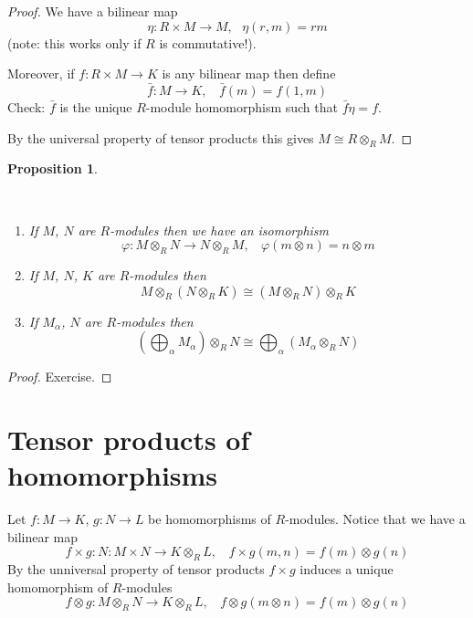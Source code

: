 \documentclass[12pt, letterpaper, oneside]{article}
\theoremstyle{plain}
\newtheorem{proposition}[theorem]{Proposition}
\theoremstyle{definition}
\newcommand{\benu}{\begin{enumerate}}
\newcommand{\eenu}{\end{enumerate}}
\newcommand{\vs}{\vskip 5mm}
\begin{document}
\vs

\begin{proof}
We have a bilinear map 
$$\eta \colon R\times M \to M, \ \ \ \eta(r, m) = rm$$
(note: this works only if $R$ is commutative!). 

Moreover, if $f\colon R\times M \to K$ is any bilinear map then define 
$$\bar{f}\colon M \to K , \ \ \ \ \bar{f}(m) = f(1, m)$$
Check: $\bar{f}$ is the unique $R$-module homomorphism such that $\bar{f}\eta = f$. 

By the universal property of tensor products this gives $M \cong R\otimes_{R} M$.
\end{proof}


\vs\vs

\begin{proposition}\ 

\vskip -13mm

\ 
\benu
\item If $M$, $N$ are $R$-modules then we have an isomorphism
$$\varphi \colon M\otimes_{R}N \to N \otimes_{R} M, \ \ \ \ \varphi(m\otimes n) = n\otimes m$$
\item If $M$, $N$, $K$ are $R$-modules then 
$$M\otimes_{R}(N\otimes_{R} K) \cong (M\otimes_{R} N)\otimes_{R} K$$
\item If $M_{\alpha}$, $N$ are $R$-modules then 
$$(\bigoplus_{\alpha}M_{\alpha})\otimes_{R} N \cong \bigoplus_{\alpha} (M_{\alpha}\otimes_{R} N)$$
\eenu

\end{proposition}

\vs

\begin{proof}
Exercise.
\end{proof}













\newpage
\section{Tensor products of homomorphisms}
\label{SEC_TENSORPRODHOM}


Let $f\colon M \to K$, $g\colon N \to L$ be homomorphisms of $R$-modules. 
Notice that we have a bilinear map 
$$f\times g\colon N \colon M\times N \to K \otimes_{R} L, \ \ \ \ f\times g(m, n) = f(m)\otimes g(n)$$
By the unniversal property of tensor products $f\times g$ induces a unique homomorphism 
of $R$-modules
$$f\otimes g \colon M\otimes_{R}N \to K \otimes_{R} L, \ \ \ \ f\otimes g(m\otimes n) = f(m)\otimes g(n)$$
\end{document}

